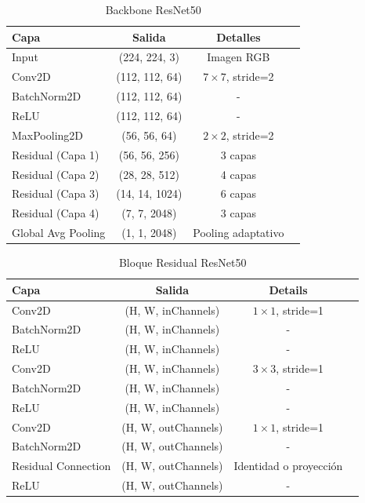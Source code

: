\documentclass[twocolumn]{article}
\begin{document}
\begin{table}[h!]
\centering
\label{tab:resnet50arch}
\begin{tabular}{|l|c|c|c|}
\hline
\textbf{Capa} & \textbf{Salida} & \textbf{Detalles} \\ \hline
    Input                 & (224, 224, 3)        & Imagen RGB \\ \hline
    Conv2D                & (112, 112, 64)       & $7\times7$, stride=2 \\ \hline
    BatchNorm2D           & (112, 112, 64)       & - \\ \hline
    ReLU                  & (112, 112, 64)       & - \\ \hline
    MaxPooling2D          & (56, 56, 64)         & $2\times2$, stride=2 \\ \hline
    Residual (Capa 1)     & (56, 56, 256)        & 3 capas    \\ \hline
    Residual (Capa 2)     & (28, 28, 512)        & 4 capas    \\ \hline
    Residual (Capa 3)     & (14, 14, 1024)       & 6 capas    \\ \hline
    Residual (Capa 4)     & (7, 7, 2048)         & 3 capas    \\ \hline
    Global Avg Pooling    & (1, 1, 2048)         & Pooling adaptativo \\ \hline
\end{tabular}
\caption{Backbone ResNet50}
\end{table}


\begin{table}[h!]
\centering
\label{tab:residual_block}
\begin{tabular}{|l|c|c|c|}
\hline
    \textbf{Capa} & \textbf{Salida}  & \textbf{Details} \\ \hline
    Conv2D                & (H, W, inChannels)   & $1\times1$, stride=1 \\ \hline
    BatchNorm2D           & (H, W, inChannels)   & - \\ \hline
    ReLU                  & (H, W, inChannels)   & - \\ \hline
    Conv2D                & (H, W, inChannels)   & $3\times3$, stride=1 \\ \hline
    BatchNorm2D           & (H, W, inChannels)   & - \\ \hline
    ReLU                  & (H, W, inChannels)   & - \\ \hline
    Conv2D                & (H, W, outChannels)  & $1\times1$, stride=1 \\ \hline
    BatchNorm2D           & (H, W, outChannels)  & - \\ \hline
    Residual Connection   & (H, W, outChannels)  & Identidad o proyección \\ \hline
    ReLU                  & (H, W, outChannels)  & - \\ \hline
\end{tabular}
\caption{Bloque Residual ResNet50}
\end{table}
\end{document}
